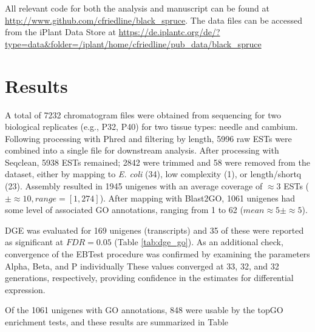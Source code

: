 \documentclass[11pt]{article}
\begin{document}
All relevant code for both the analysis and manuscript can be found at
\url{http://www.github.com/cfriedline/black_spruce}.  The data files can 
be accessed from the iPlant Data Store at 
\url{https://de.iplantc.org/de/?type=data&folder=/iplant/home/cfriedline/pub_data/black_spruce}

\section*{Results}

A total of 7232 chromatogram files were obtained from sequencing for
two biological replicates (e.g., P32, P40) for two tissue types:
needle and cambium.  Following processing with Phred and filtering by
length, 5996 raw ESTs were combined into a single file for downstream
analysis.  After processing with Seqclean, 5938 ESTs remained; 2842
were trimmed and 58 were removed from the dataset, either by mapping
to \textit{E. coli} (34), low complexity (1), or length/shortq (23).
Assembly resulted in 1945 unigenes with an average coverage of
$\approx{3}$ ESTs ($\pm \approx{10}, range=[1,274]$). After mapping 
with Blast2GO, 1061 unigenes had some level of associated GO annotations, 
ranging from 1 to 62 ($mean \approx{5} \pm \approx{5}$).

DGE was evaluated for 169 unigenes (transcripts) and 35 of these were
reported as significant at $FDR = 0.05$ (Table \ref{tab:dge_go}). As an additional check,
convergence of the EBTest procedure was confirmed by examining the
parameters Alpha, Beta, and P individually These values converged at
33, 32, and 32 generations, respectively, providing confidence in the
estimates for differential expression.

Of the 1061 unigenes with GO annotations, 848 were usable by the 
topGO enrichment tests, and these results are summarized in Table 




\clearpage

\singlespacing



\clearpage
\end{document}
